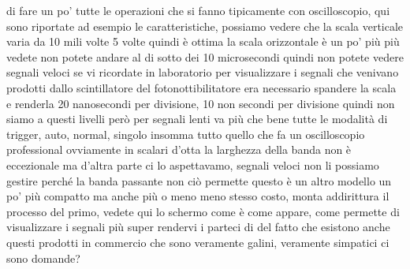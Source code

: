 {di fare un po' tutte le operazioni che si fanno tipicamente con oscilloscopio, qui sono riportate ad esempio le caratteristiche, possiamo vedere che la scala verticale varia da 10 mili volte 5 volte quindi è ottima la scala orizzontale è un po' più più vedete non potete andare al di sotto dei 10 microsecondi quindi non potete vedere segnali veloci se vi ricordate in laboratorio per visualizzare i segnali che venivano prodotti dallo scintillatore del fotonottibilitatore era necessario spandere la scala e renderla 20 nanosecondi per divisione, 10 non secondi per divisione quindi non siamo a questi livelli però per segnali lenti va più che bene tutte le modalità di trigger, auto, normal, singolo insomma tutto quello che fa un oscilloscopio professional ovviamente in scalari d'otta la larghezza della banda non è eccezionale ma d'altra parte ci lo aspettavamo, segnali veloci non li possiamo gestire perché la banda passante non ciò permette questo è un altro modello un po' più compatto ma anche più o meno meno stesso costo, monta addirittura il processo del primo, vedete qui lo schermo come è come appare, come permette di visualizzare i segnali più super rendervi i parteci di del fatto che esistono anche questi prodotti in commercio che sono veramente galini, veramente simpatici ci sono domande?}